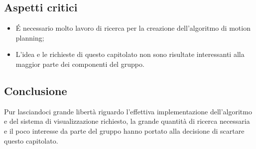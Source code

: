 \subsection{Aspetti critici}
\begin{itemize}
\item É necessario molto lavoro di ricerca per la creazione dell'algoritmo di motion planning;
\item L'idea e le richieste di questo capitolato non sono risultate interessanti alla maggior parte dei componenti del gruppo.
\end{itemize}

\subsection{Conclusione}
Pur lasciandoci grande libertà riguardo l'effettiva implementazione dell'algoritmo e del sistema di visualizzazione richiesto, la grande quantità di ricerca necessaria e il poco interesse da parte del gruppo hanno portato alla decisione di scartare questo capitolato.